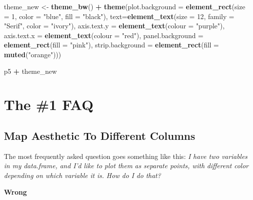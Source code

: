\documentclass[]{book}
\newenvironment{Shaded}{\begin{snugshade}}{\end{snugshade}}
\newcommand{\KeywordTok}[1]{\textcolor[rgb]{0.13,0.29,0.53}{\textbf{#1}}}
\newcommand{\DataTypeTok}[1]{\textcolor[rgb]{0.13,0.29,0.53}{#1}}
\newcommand{\DecValTok}[1]{\textcolor[rgb]{0.00,0.00,0.81}{#1}}
\newcommand{\StringTok}[1]{\textcolor[rgb]{0.31,0.60,0.02}{#1}}
\newcommand{\OperatorTok}[1]{\textcolor[rgb]{0.81,0.36,0.00}{\textbf{#1}}}
\newcommand{\NormalTok}[1]{#1}
\begin{document}
\begin{Shaded}
\begin{Highlighting}[]
\NormalTok{theme_new <-}\StringTok{ }\KeywordTok{theme_bw}\NormalTok{() }\OperatorTok{+}
\StringTok{  }\KeywordTok{theme}\NormalTok{(}\DataTypeTok{plot.background =} \KeywordTok{element_rect}\NormalTok{(}\DataTypeTok{size =} \DecValTok{1}\NormalTok{, }\DataTypeTok{color =} \StringTok{"blue"}\NormalTok{, }\DataTypeTok{fill =} \StringTok{"black"}\NormalTok{),}
        \DataTypeTok{text=}\KeywordTok{element_text}\NormalTok{(}\DataTypeTok{size =} \DecValTok{12}\NormalTok{, }\DataTypeTok{family =} \StringTok{"Serif"}\NormalTok{, }\DataTypeTok{color =} \StringTok{"ivory"}\NormalTok{),}
        \DataTypeTok{axis.text.y =} \KeywordTok{element_text}\NormalTok{(}\DataTypeTok{colour =} \StringTok{"purple"}\NormalTok{),}
        \DataTypeTok{axis.text.x =} \KeywordTok{element_text}\NormalTok{(}\DataTypeTok{colour =} \StringTok{"red"}\NormalTok{),}
        \DataTypeTok{panel.background =} \KeywordTok{element_rect}\NormalTok{(}\DataTypeTok{fill =} \StringTok{"pink"}\NormalTok{),}
        \DataTypeTok{strip.background =} \KeywordTok{element_rect}\NormalTok{(}\DataTypeTok{fill =} \KeywordTok{muted}\NormalTok{(}\StringTok{"orange"}\NormalTok{)))}

\NormalTok{p5 }\OperatorTok{+}\StringTok{ }\NormalTok{theme_new}
\end{Highlighting}
\end{Shaded}

\section{The \#1 FAQ}\label{the-1-faq}

\subsection{Map Aesthetic To Different
Columns}\label{map-aesthetic-to-different-columns}

The most frequently asked question goes something like this: \emph{I
have two variables in my data.frame, and I'd like to plot them as
separate points, with different color depending on which variable it is.
How do I do that?}

\textbf{Wrong}
\end{document}
